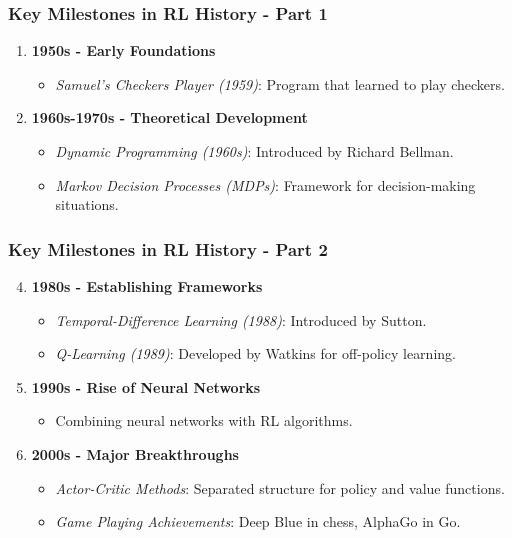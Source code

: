 \documentclass[aspectratio=169]{beamer}
\begin{document}
\begin{frame}[fragile]
    \frametitle{Key Milestones in RL History - Part 1}
    \begin{enumerate}
        \item \textbf{1950s - Early Foundations}
            \begin{itemize}
                \item \textit{Samuel's Checkers Player (1959)}: Program that learned to play checkers.
            \end{itemize}
        \item \textbf{1960s-1970s - Theoretical Development}
            \begin{itemize}
                \item \textit{Dynamic Programming (1960s)}: Introduced by Richard Bellman.
                \item \textit{Markov Decision Processes (MDPs)}: Framework for decision-making situations.
            \end{itemize}
    \end{enumerate}
\end{frame}

\begin{frame}[fragile]
    \frametitle{Key Milestones in RL History - Part 2}
    \begin{enumerate}
        \setcounter{enumi}{3}
        \item \textbf{1980s - Establishing Frameworks}
            \begin{itemize}
                \item \textit{Temporal-Difference Learning (1988)}: Introduced by Sutton.
                \item \textit{Q-Learning (1989)}: Developed by Watkins for off-policy learning.
            \end{itemize}
        \item \textbf{1990s - Rise of Neural Networks}
            \begin{itemize}
                \item Combining neural networks with RL algorithms.
            \end{itemize}
        \item \textbf{2000s - Major Breakthroughs}
            \begin{itemize}
                \item \textit{Actor-Critic Methods}: Separated structure for policy and value functions.
                \item \textit{Game Playing Achievements}: Deep Blue in chess, AlphaGo in Go.
            \end{itemize}
    \end{enumerate}
\end{frame}
\end{document}
